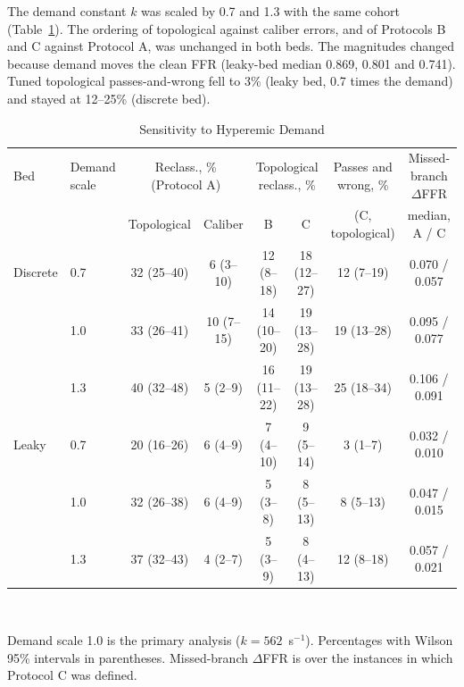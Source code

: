 The demand constant $k$ was scaled by 0.7 and 1.3 with the same cohort (Table~\ref{tab:demand}). The ordering of
topological against caliber errors, and of Protocols B and C against Protocol A, was unchanged in both beds. The
magnitudes changed because demand moves the clean FFR (leaky-bed median 0.869, 0.801 and 0.741). Tuned topological
passes-and-wrong fell to 3\% (leaky bed, 0.7 times the demand) and stayed at 12--25\% (discrete bed).
\begin{table}[!h]
\caption{Sensitivity to Hyperemic Demand}\label{tab:demand}
\centering\small
\begin{tabular}{@{}llcccccc@{}}
\toprule
Bed & Demand scale & \multicolumn{2}{c}{Reclass., \% (Protocol A)} & \multicolumn{2}{c}{Topological reclass., \%} &
Passes and wrong, \% & Missed-branch $\Delta$FFR\\
\cmidrule(lr){3-4}\cmidrule(lr){5-6}
 & & Topological & Caliber & B & C & (C, topological) & median, A / C\\
\midrule
Discrete & 0.7 & 32 (25--40) & 6 (3--10) & 12 (8--18) & 18 (12--27) & 12 (7--19) & 0.070 / 0.057 \\
 & 1.0 & 33 (26--41) & 10 (7--15) & 14 (10--20) & 19 (13--28) & 19 (13--28) & 0.095 / 0.077 \\
 & 1.3 & 40 (32--48) & 5 (2--9) & 16 (11--22) & 19 (13--28) & 25 (18--34) & 0.106 / 0.091 \\
Leaky & 0.7 & 20 (16--26) & 6 (4--9) & 7 (4--10) & 9 (5--14) & 3 (1--7) & 0.032 / 0.010 \\
 & 1.0 & 32 (26--38) & 6 (4--9) & 5 (3--8) & 8 (5--13) & 8 (5--13) & 0.047 / 0.015 \\
 & 1.3 & 37 (32--43) & 4 (2--7) & 5 (3--9) & 8 (4--13) & 12 (8--18) & 0.057 / 0.021 \\
\bottomrule
\end{tabular}
\\[3pt]
\parbox{0.9\textwidth}{\footnotesize Demand scale 1.0 is the primary analysis ($k = 562$~s$^{-1}$). Percentages with Wilson 95\%
intervals in parentheses. Missed-branch $\Delta$FFR is over the instances in which Protocol C was defined.}
\end{table}

